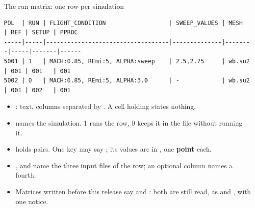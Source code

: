 \begin{frame}[fragile]{The run matrix: one row per simulation}
\begin{lstlisting}
POL  | RUN | FLIGHT_CONDITION                  | SWEEP_VALUES | MESH   | REF | SETUP | PPROC
-----|-----|-----------------------------------|--------------|--------|-----|-------|------
5001 | 1   | MACH:0.85, REmi:5, ALPHA:sweep    | 2.5,2.75     | wb.su2 | 001 | 001   | 001
5002 | 0   | MACH:0.85, REmi:5, ALPHA:3.0      | -            | wb.su2 | 001 | 002   | 001
\end{lstlisting}
\begin{itemize}\small
  \item {}: text, columns separated by
        \code{|}. A cell holding \code{-} states nothing.
  \item {} names the simulation.  1 runs the row, 0 keeps
        it in the file without running it.
  \item {} holds  pairs. One key may say
        ; its values are in , one
        \textbf{point} each.
  \item {},  and  name the three input files
        of the row; an optional  column names a fourth.
  \item Matrices written before this release say  and
        : both are still read, as  and
        , with one notice.
\end{itemize}
\end{frame}

